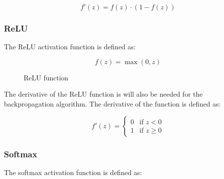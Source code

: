 \begin{equation}
    \label{eq:sigmoid_derivative}
    f'(z) = f(z) \cdot (1 - f(z))
\end{equation}

\subsubsection{ReLU}

\noindent
The ReLU activation function is defined as:

\begin{equation}
    \label{eq:relu}
    f(z) = \max(0, z)
\end{equation}

\begin{center}
    \begin{figure}[ht]
        \caption{ReLU function}
    \end{figure}
\end{center}

The derivative of the ReLU function is will also be needed for the backpropagation algorithm. The derivative
of the function is defined as:

\begin{equation}
    \label{eq:relu_derivative}
    f'(z) = \begin{cases}
        0 & \text{if } z < 0 \\
        1 & \text{if } z \geq 0
    \end{cases}
\end{equation}

\subsubsection{Softmax}
\noindent
The softmax activation function is defined as:

